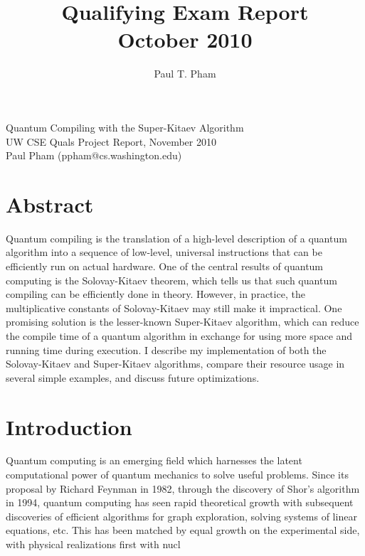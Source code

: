 \documentclass{toc}
\title{Qualifying Exam Report\\ October 2010}
\author{Paul T. Pham}
\theoremstyle{plain}
\theoremstyle{definition}
\begin{document}
\newcommand{\braket}[2]{\langle #1|#2 \rangle}
\newcommand{\normtwo}{\frac{1}{\sqrt{2}}}

\begin{center}
\LARGE{Quantum Compiling with the Super-Kitaev Algorithm}\\
\Large{UW CSE Quals Project Report, November 2010}\\
\Large{Paul Pham (ppham@cs.washington.edu)}
\end{center}

\section{Abstract}

Quantum compiling is the translation of a high-level description of a quantum
algorithm into a sequence of low-level, universal instructions that can be
efficiently run on actual hardware. One of the central results of quantum
computing is the Solovay-Kitaev theorem, which tells us that such quantum
compiling can be efficiently done in theory. However, in practice, the
multiplicative constants of Solovay-Kitaev may still make it impractical.
One promising solution is the lesser-known Super-Kitaev algorithm, which
can reduce the compile time of a quantum algorithm in exchange for using
more space and running time during execution. I describe my implementation
of both the Solovay-Kitaev and Super-Kitaev algorithms, compare their
resource usage in several simple examples, and discuss future optimizations.

\section{Introduction}


Quantum computing is an emerging field which harnesses the latent
computational power of quantum mechanics to solve useful problems.
Since its proposal by Richard Feynman in 1982, through the discovery
of Shor's algorithm in 1994, quantum computing has seen rapid theoretical growth
with subsequent discoveries of efficient algorithms for graph exploration,
solving systems of linear equations, etc.
This has been matched by equal growth on the experimental side, with physical
realizations first with nucl
\end{document}
